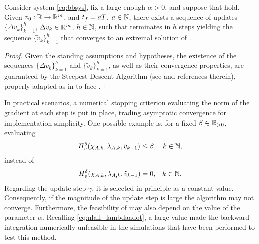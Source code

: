 \begin{theorem}
  \label{thm:nlall_main}
  Consider system \eqref{eq:bbsys}, fix a large enough $\alpha>0$, and suppose that  hold. Given $v_0 : \mathbb{R} \rightarrow \mathbb{R}^{m}$, and $t_f=aT$, $a\in\mathbb{N}$, there exists a sequence of updates $\{\Delta v_k\}_{k=1}^h$, $\Delta v_k\in\mathbb{R}^m$, $h\in\mathbb{N}$, such that  terminates in $h$ steps yielding the sequence $\{\tilde{v}_k\}_{k=1}^h$ that converges to an extremal solution of .\closestatement
\end{theorem}
\begin{proof}
  Given the standing assumptions and hypotheses, the existence of the sequences $\{\Delta v_k\}_{k=1}^h$ and $\{\tilde{v}_k\}_{k=1}^h$, as well as their convergence properties, are guaranteed by the Steepest Descent Algorithm (see \cite[Sec. 6.2]{kirk_optimal_1970} and references therein), properly adapted as in  to face .
\end{proof}

\begin{remark}
  \label{rem:nlall_algparams}
  In practical scenarios, a numerical stopping criterion evaluating the norm of the gradient at each step is put in place, trading asymptotic convergence for implementation simplicity. One possible example is, for a fixed $\beta\in\mathbb{R}_{>0}$, evaluating
  \begin{align}
    H_v^\delta(\chi_{A,k},\lambda_{A,k},\tilde{v}_{k-1}) &\leq \beta, & k\in\mathbb{N},
  \end{align}
  instead of
  \begin{align}
    H_v^\delta(\chi_{A,k},\lambda_{A,k},\tilde{v}_{k-1}) &= 0, & k\in\mathbb{N}.
  \end{align}
  Regarding the update step $\gamma$, it is selected in principle as a constant value. Consequently, if the magnitude of the update step is large the algorithm may not converge.
  Furthermore, the feasibility of  may also depend on the value of the parameter $\alpha$. Recalling \eqref{eq:nlall_lambdaadot}, a large value made the backward integration numerically unfeasible in the simulations that have been performed to test this method.\closeremark
\end{remark}

